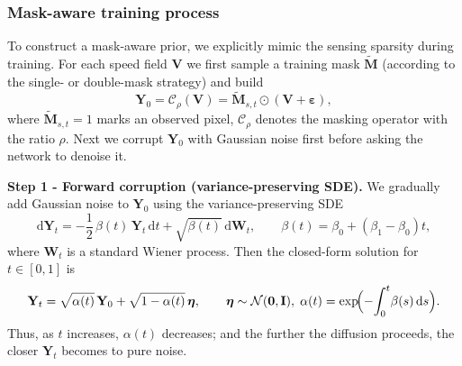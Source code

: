 \documentclass[a4paper,fleqn]{cas-sc}
\numberwithin{equation}{section}
\begin{document}
\subsubsection{Mask-aware training process}
To construct a mask-aware prior, we explicitly mimic the sensing sparsity
during training.  For each speed field \(\mathbf V\) we first
sample a training mask $\tilde{\mathbf M}$ (according to the single- or
double-mask strategy) and build
\begin{equation}
\mathbf Y_0=\mathcal C_\rho(\mathbf V)=\tilde{\mathbf M}_{s,t}\odot(\mathbf V + \boldsymbol\varepsilon),
\end{equation}
where $\tilde{\mathbf M}_{s,t}=1$ marks an observed pixel, $\mathcal C_\rho$ denotes the masking operator with the ratio $\rho$. Next we corrupt \(\mathbf Y_0\) with Gaussian noise first before asking the network to denoise it.

\noindent \textbf{Step 1 - Forward corruption (variance-preserving SDE).}
We gradually add Gaussian noise to \(\mathbf Y_0\) using the
variance-preserving SDE
\begin{equation}
    \mathrm d\mathbf Y_t = -\frac12\,\beta(t)\,\mathbf Y_t\,\mathrm dt + \sqrt{\beta(t)}\,\mathrm d\mathbf W_t , \qquad \beta(t)=\beta_0+(\beta_1-\beta_0)t,
\end{equation}
where \(\mathbf W_t\) is a standard Wiener process. Then the closed-form solution for \(t\in[0,1]\) is
\begin{equation}
    \mathbf Y_t= \sqrt{\alpha(t)}\,\mathbf Y_0+ \sqrt{1-\alpha(t)}\,\boldsymbol\eta ,\qquad\boldsymbol\eta\sim\mathcal N(\mathbf 0,\mathbf I),\;\alpha(t)=\exp\!\Bigl(-\!\int_0^t\!\beta(s)\,\mathrm ds\Bigr).
\end{equation}
Thus, as $t$ increases, $\alpha(t)$ decreases; and the further the diffusion proceeds, the closer \(\mathbf Y_t\) becomes to pure noise.
\end{document}
